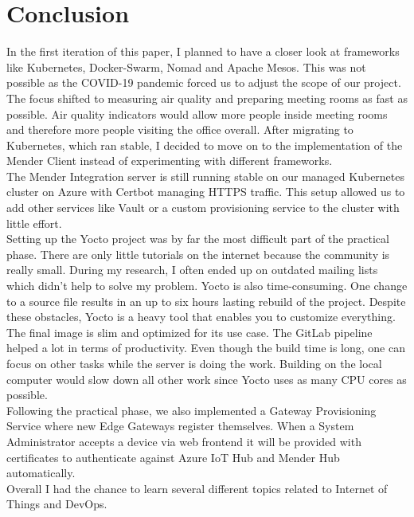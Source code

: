 \section{Conclusion}
In the first iteration of this paper, I planned to have a closer look at frameworks like Kubernetes, Docker-Swarm, Nomad and Apache Mesos. This was not possible as the COVID-19 pandemic forced us to adjust the scope of our project. The focus shifted to measuring air quality and preparing meeting rooms as fast as possible. Air quality indicators would allow more people inside meeting rooms and therefore more people visiting the office overall. After migrating to Kubernetes, which ran stable, I decided to move on to the implementation of the Mender Client instead of experimenting with different frameworks.\\
The Mender Integration server is still running stable on our managed Kubernetes cluster on Azure with Certbot managing HTTPS traffic. This setup allowed us to add other services like Vault or a custom provisioning service to the cluster with little effort.\\
Setting up the Yocto project was by far the most difficult part of the practical phase. There are only little tutorials on the internet because the community is really small. During my research, I often ended up on outdated mailing lists which didn't help to solve my problem. Yocto is also time-consuming. One change to a source file results in an up to six hours lasting rebuild of the project. Despite these obstacles, Yocto is a heavy tool that enables you to customize everything. The final image is slim and optimized for its use case. The GitLab pipeline helped a lot in terms of productivity. Even though the build time is long, one can focus on other tasks while the server is doing the work. Building on the local computer would slow down all other work since Yocto uses as many CPU cores as possible.\\
Following the practical phase, we also implemented a Gateway Provisioning Service where new Edge Gateways register themselves. When a System Administrator accepts a device via web frontend it will be provided with certificates to authenticate against Azure IoT Hub and Mender Hub automatically.\\
Overall I had the chance to learn several different topics related to Internet of Things and DevOps.
\newpage
